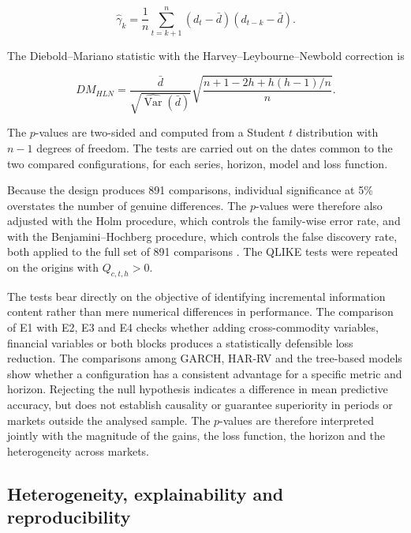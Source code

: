 \documentclass[a4paper,fleqn]{cas-sc}
\begin{document}
\begin{equation}
\widehat{\gamma}_{k}
=
\frac{1}{n}
\sum_{t=k+1}^{n}
(d_t-\bar d)(d_{t-k}-\bar d).
\label{eq:dm_covariance}
\end{equation}

The Diebold--Mariano statistic with the Harvey--Leybourne--Newbold correction is

\begin{equation}
DM_{HLN}
=
\frac{\bar d}{\sqrt{\widehat{\operatorname{Var}}(\bar d)}}
\sqrt{
\frac{n+1-2h+h(h-1)/n}{n}
}.
\label{eq:dm_hln}
\end{equation}

The \(p\)-values are two-sided and computed from a Student \(t\) distribution with \(n-1\) degrees of freedom. The tests are carried out on the dates common to the two compared configurations, for each series, horizon, model and loss function.

Because the design produces 891 comparisons, individual significance at 5\% overstates the number of genuine differences. The \(p\)-values were therefore also adjusted with the Holm procedure, which controls the family-wise error rate, and with the Benjamini--Hochberg procedure, which controls the false discovery rate, both applied to the full set of 891 comparisons \citep{Holm1979,BenjaminiHochberg1995}. The QLIKE tests were repeated on the origins with \(Q_{c,t,h}>0\).

The tests bear directly on the objective of identifying incremental information content rather than mere numerical differences in performance. The comparison of E1 with E2, E3 and E4 checks whether adding cross-commodity variables, financial variables or both blocks produces a statistically defensible loss reduction. The comparisons among GARCH, HAR-RV and the tree-based models show whether a configuration has a consistent advantage for a specific metric and horizon. Rejecting the null hypothesis indicates a difference in mean predictive accuracy, but does not establish causality or guarantee superiority in periods or markets outside the analysed sample. The \(p\)-values are therefore interpreted jointly with the magnitude of the gains, the loss function, the horizon and the heterogeneity across markets.

\subsection{Heterogeneity, explainability and reproducibility}
\label{subsec:additional_analyses}
\end{document}
